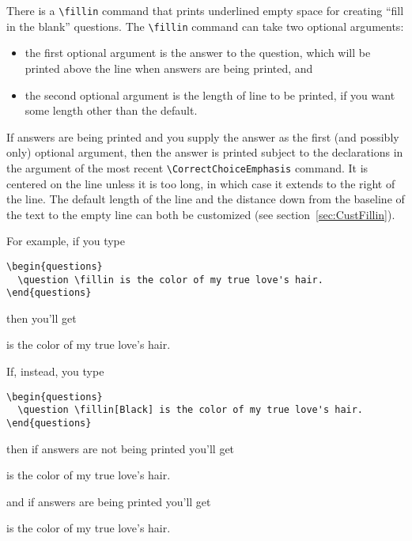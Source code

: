 \documentclass[12pt]{exam}
\begin{document}
There is a \verb"\fillin" command that prints underlined empty space
for creating ``fill in the blank'' questions.  The \verb"\fillin"
command can take two optional arguments:
\begin{itemize}
\item the first optional argument is the answer to the question, which
  will be printed above the line when answers are being printed, and
\item the second optional argument is the length of line to be
  printed, if you want some length other than the default.
\end{itemize}
If answers are being printed and you supply the answer as the first
(and possibly only) optional argument, then the answer is printed
subject to the declarations in the argument of the most recent
\verb"\CorrectChoiceEmphasis" command.  It is centered on the line
unless it is too long, in which case it extends to the right of the
line.  The default length of the line and the distance down from the
baseline of the text to the empty line can both be customized (see
section~\ref{sec:CustFillin}).

For example, if you type
\begin{verbatim}
\begin{questions}
  \question \fillin is the color of my true love's hair.
\end{questions}
\end{verbatim}
then you'll get
\begin{questions}
  \question \fillin is the color of my true love's hair.
\end{questions}
If, instead, you type
\begin{verbatim}
\begin{questions}
  \question \fillin[Black] is the color of my true love's hair.
\end{questions}
\end{verbatim}
then if answers are not being printed you'll get
\begin{questions}
  \question \fillin[Black] is the color of my true love's hair.
\end{questions}
and if answers are being printed you'll get
\printanswers
\begin{questions}
  \question \fillin[Black] is the color of my true love's hair.
\end{questions}
\noprintanswers
\end{document}
